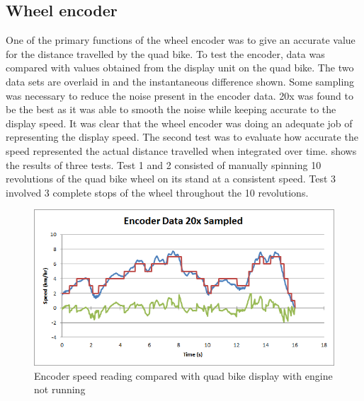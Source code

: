 \documentclass[main.tex]{subfiles}
\begin{document}
\subsection{Wheel encoder}
One of the primary functions of the wheel encoder was to give an accurate value for the distance travelled by the quad bike. To test the encoder, data was compared with values obtained from the display unit on the quad bike. The two data sets are overlaid in  and the instantaneous difference shown. Some sampling was necessary to reduce the noise present in the encoder data. 20x was found to be the best as it was able to smooth the noise while keeping accurate to the display speed. It was clear that the wheel encoder was doing an adequate job of representing the display speed. The second test was to evaluate how accurate the speed represented the actual distance travelled when integrated over time.  shows the results of three tests. Test 1 and 2 consisted of manually spinning 10 revolutions of the quad bike wheel on its stand at a consistent speed. Test 3 involved 3 complete stops of the wheel throughout the 10 revolutions.

\begin{figure}[ht]
\includegraphics[width=1\textwidth]{5-Testing/encoder_data_20x_sampled.png}
\centering
\caption{Encoder speed reading compared with quad bike display with engine not running}
\end{figure}
\end{document}
